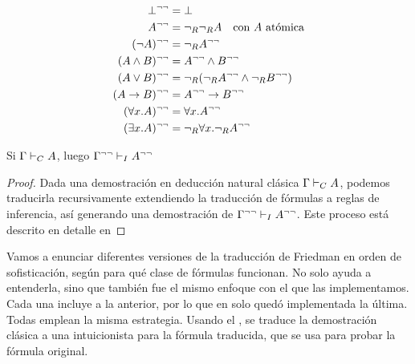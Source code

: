 \begin{definition}
    \begin{align*}
        \bot^{\neg\neg}                         & = \bot                                                             \\
        A^{\neg\neg}                        & = \neg_R\neg_R A
        \quad \text{con $A$ atómica}                                                                              \\
        (\neg A)^{\neg\neg}                & = \neg_R A^{\neg\neg}                                          \\
        (A \wedge B)^{\neg\neg}       & = A^{\neg\neg} \wedge B^{\neg\neg}                     \\
        (A \vee B)^{\neg\neg}        & = \neg_R(\neg_RA^{\neg\neg} \wedge \neg_RB^{\neg\neg}) \\
        (A \rightarrow B)^{\neg\neg} & = A^{\neg\neg} \rightarrow B^{\neg\neg}               \\
        (\forall x . A)^{\neg\neg}          & = \forall x . A^{\neg\neg}                                    \\
        (\exists x . A)^{\neg\neg}          & = \neg_R \forall x . \neg_R A^{\neg\neg}
    \end{align*}
\end{definition}

\begin{theorem}
    \label{fri:thm:dneg-trans-classic-int}
    Si $\Gamma \vdash_C A$, luego $\Gamma^{\neg\neg} \vdash_I A^{\neg\neg}$
\end{theorem}
\begin{proof}
    Dada una demostración en deducción natural clásica $\Gamma \vdash_C A$, podemos traducirla recursivamente extendiendo la traducción de fórmulas a reglas de inferencia, así generando una demostración de $\Gamma^{\neg\neg} \vdash_I A^{\neg\neg}$.
    Este proceso está descrito en detalle en 
\end{proof}

Vamos a enunciar diferentes versiones de la traducción de Friedman en orden de sofisticación, según para qué clase de fórmulas funcionan. No solo ayuda a entenderla, sino que también fue el mismo enfoque con el que las implementamos. Cada una incluye a la anterior, por lo que en \ppaTool{} solo quedó implementada la última. Todas emplean la misma estrategia. Usando el , se traduce la demostración clásica a una intuicionista para la fórmula traducida, que se usa para probar la fórmula original.



